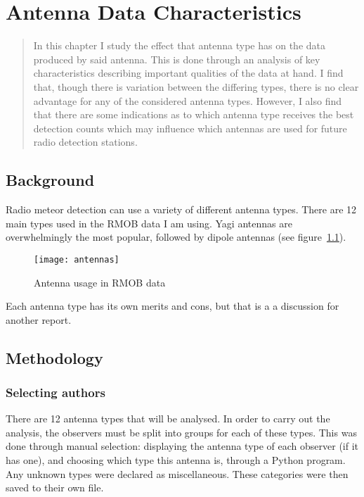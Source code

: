 \chapter{Antenna Data Characteristics}
\label{chap:antenna}
\begin{strip}
	\begin{minipage}{\textwidth}
		\begin{abstract}
			In this chapter I study the effect that antenna type has on the data produced by said antenna. This is done through an analysis of key characteristics describing important qualities of the data at hand. I find that, though there is variation between the differing types, there is no clear advantage for any of the considered antenna types. However, I also find that there are some indications as to which antenna type receives the best detection counts which may influence which antennas are used for future radio detection stations.
		\end{abstract}
	\end{minipage}
\end{strip}
\section{Background}
Radio meteor detection can use a variety of different antenna types. There are 12 main types used in the RMOB data I am using. Yagi antennas are overwhelmingly the most popular, followed by dipole antennas (see figure~\ref{fig:antennas}).
\begin{figure}[h!]
	\centering
	\texttt{[image: antennas]}
	\caption{Antenna usage in RMOB data \label{fig:antennas}}
\end{figure}
Each antenna type has its own merits and cons, but that is a a discussion for another report. 
\section{Methodology}
\subsection{Selecting authors}
There are 12 antenna types that will be analysed. In order to carry out the analysis, the observers must be split into groups for each of these types. This was done through manual selection: displaying the antenna type of each observer (if it has one), and choosing which type this antenna is, through a Python program. Any unknown types were declared as miscellaneous. These categories were then saved to their own file.
